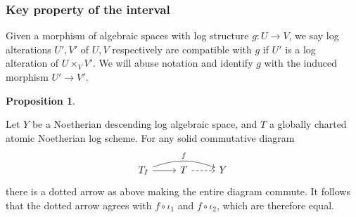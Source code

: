 \documentclass[11pt]{amsart}
\newcommand{\XYHcomment}[1]{\textcolor{brown}{[XYH: #1]}}
\newcommand{\MScomment}[1]{\textcolor{OliveGreen}{[MS: #1]}}
\theoremstyle{definition}
\theoremstyle{definition}
\newtheorem{proposition}[theorem]{Proposition}
\begin{document}
\subsubsection{Key property of the interval}
Given a morphism of algebraic spaces with log structure $g\colon U\rightarrow V$, we say log alterations $U',V'$ of $U,V$ respectively are compatible with $g$ if $U'$ is a log alteration of $U\times_{V} V'$. We will abuse notation and identify $g$ with the induced morphism $U'\rightarrow V'$.
\begin{proposition}\label{prop:IntervalFactors}

Let $Y$ be a Noetherian descending log algebraic space, and $T$ a globally charted atomic Noetherian log scheme. For any solid commutative diagram $$\begin{tikzcd}
T_I \arrow[r] \arrow[rr, bend left=20,"f"] & T \arrow[r, dashed] & Y
\end{tikzcd}
$$
there is a dotted arrow as above making the entire diagram commute. It follows that the dotted arrow agrees with $f\circ \iota_1$ and $f\circ \iota_2$, which are therefore equal. 
\end{proposition}
\end{document}
